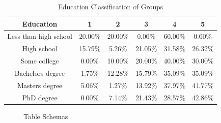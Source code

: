 \begin{table}[h!]
  \centering
  \caption{Education Classification of Groups}
  \label{tab:edu_stak}
  \begin{tabular}{cccccc}
    \toprule
     Education&1&2&3&4&5\\
    \midrule
    
Less than high school	&20.00\%	&20.00\%	&0.00\%	&60.00\%	&0.00\%\\
High school	& 15.79\%&	5.26\%	&21.05\%	&31.58\%	&26.32\%\\
Some college	 & 0.00\%&	10.00\%	&20.00\%	&40.00\%&	30.00\%\\
Bachelors degree 	&1.75\%	&12.28\%&	15.79\%	&35.09\%	&35.09\%\\
Masters degree	&5.06\%	&1.27\%	&13.92\%	&37.97\%	&41.77\%\\
PhD degree	&0.00\%	&7.14\%	&21.43\%	&28.57\%	&42.86\%\\
    \bottomrule
  \end{tabular}
\end{table}

\begin{figure}[htp]
\caption{Table Schemas}
\label{fig:ss3}
\end{figure} 

